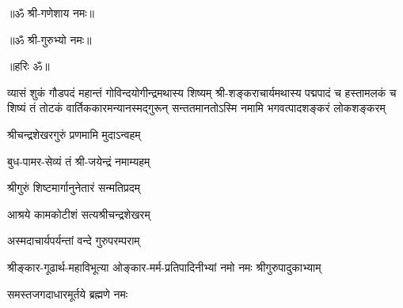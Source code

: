 

\centerline{॥ॐ श्री-गणेशाय नमः॥}
\centerline{॥ॐ श्री-गुरुभ्यो नमः॥}
\centerline{॥हरिः ॐ॥}


\setlength{\shlokaspaceskip}{0pt}
%
{व्यासं शुकं गौडपदं महान्तं गोविन्दयोगीन्द्रमथास्य शिष्यम्}%
{श्री-शङ्कराचार्यमथास्य पद्मपादं च हस्तामलकं च शिष्यं}%
{तं तोटकं वार्तिककारमन्यानस्मद्गुरून् सन्ततमानतोऽस्मि}%
\setlength{\shlokaspaceskip}{24pt}
{नमामि भगवत्पादशङ्करं लोकशङ्करम्}


{श्रीचन्द्रशेखरगुरुं प्रणमामि मुदाऽन्वहम्}

{बुध-पामर-सेव्यं तं श्री-जयेन्द्रं नमाम्यहम्}

{श्रीगुरुं शिष्टमार्गानुनेतारं सन्मतिप्रदम्}

{आश्रये कामकोटीशं सत्यश्रीचन्द्रशेखरम्} 

{अस्मदाचार्यपर्यन्तां वन्दे गुरुपरम्पराम्}

{श्रीङ्कार-गूढार्थ-महाविभूत्या}
{ओङ्कार-मर्म-प्रतिपादिनीभ्यां}
{नमो नमः श्रीगुरुपादुकाभ्याम्}

{समस्तजगदाधारमूर्तये ब्रह्मणे नमः}
